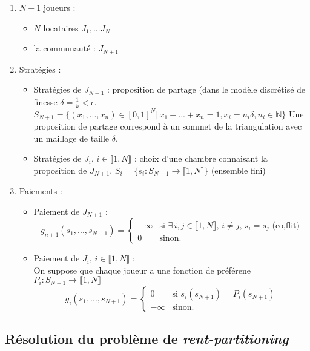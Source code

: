 \documentclass[12pt,twoside,a4paper]{article}
\begin{document}
\begin{enumerate}
\item $N+1$ joueurs :
	\begin{itemize}
		\item $N$ locataires $J_1, ... J_N$
		\item la communaut\'e : $J_{N+1}$
	\end{itemize}
\item Strat\'egies : 
	\begin{itemize}
		\item Strat\'egies de $J_{N+1}$ : proposition de partage (dans le mod\`ele discr\'etis\'e de finesse $\delta = \frac{1}{k} < \epsilon$. $S_{N+1} = \{ (x_1, ..., x_n)\in[0,1]^N |\, x_1 + ... + x_n=1, x_i = n_i \delta, n_i\in\mathbb{N}\}$
		Une proposition de partage correspond \`a un sommet de la triangulation avec un maillage de taille $\delta$.
		\item Strat\'egies de $J_i,\, i\in \llbracket1,N \rrbracket$ : choix d'une chambre connaisant la proposition de $J_{N+1}$. $S_i = \{ s_i : S_{N+1} \rightarrow \llbracket1,N \rrbracket \}$ (ensemble fini)
	\end{itemize}
\item Paiements :
	\begin{itemize}
		\item Paiement de $J_{N+1}$ :
		$$
			g_{n+1}(s_1, ..., s_{N+1}) = \left\{
    			\begin{array}{ll}
        				-\infty & \mbox{si } \exists\, i,j \in\llbracket 1,N \rrbracket,\, i\neq j,\, s_i = s_j \mbox{ (co,flit)} \\
        				0 & \mbox{sinon.}
    			\end{array}
			\right.
		$$
		\item Paiement de $J_{i},\, i\in \llbracket 1,N \rrbracket$ :\\ On suppose que chaque joueur a une fonction de pr\'ef\'erene $P_i : S_{N+1} \rightarrow \llbracket 1,N \rrbracket$
		$$
			g_{i}(s_1, ..., s_{N+1}) = \left\{
    			\begin{array}{ll}
        				0 & \mbox{si } s_i(s_{N+1})=P_i(s_{N+1}) \\
        				-\infty & \mbox{sinon.}
    			\end{array}
			\right.
		$$
	\end{itemize}
\end{enumerate}

\subsection{R\'esolution du probl\`eme de \textit{rent-partitioning}}
\end{document}
